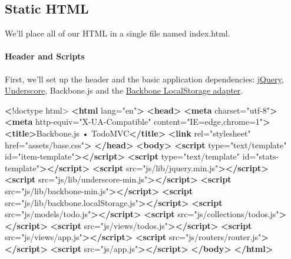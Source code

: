 \documentclass[9pt]{book}
\newenvironment{Shaded}{}{}
\newcommand{\KeywordTok}[1]{\textcolor[rgb]{0.00,0.44,0.13}{\textbf{{#1}}}}
\newcommand{\StringTok}[1]{\textcolor[rgb]{0.25,0.44,0.63}{{#1}}}
\newcommand{\OtherTok}[1]{\textcolor[rgb]{0.00,0.44,0.13}{{#1}}}
\newcommand{\ErrorTok}[1]{\textcolor[rgb]{1.00,0.00,0.00}{\textbf{{#1}}}}
\newcommand{\NormalTok}[1]{{#1}}
\begin{document}
\subsection{Static HTML}\label{static-html}

We'll place all of our HTML in a single file named index.html.

\paragraph{Header and Scripts}\label{header-and-scripts}

First, we'll set up the header and the basic application dependencies:
\href{http://jquery.com}{jQuery},
\href{http://underscorejs.org}{Underscore}, Backbone.js and the
\href{https://github.com/jeromegn/Backbone.localStorage}{Backbone
LocalStorage adapter}.

\begin{Shaded}
\begin{Highlighting}[]
\ErrorTok{<}\NormalTok{!doctype html>}
\KeywordTok{<html}\OtherTok{ lang=}\StringTok{"en"}\KeywordTok{>}
\KeywordTok{<head>}
  \KeywordTok{<meta}\OtherTok{ charset=}\StringTok{"utf-8"}\KeywordTok{>}
  \KeywordTok{<meta}\OtherTok{ http-equiv=}\StringTok{"X-UA-Compatible"}\OtherTok{ content=}\StringTok{"IE=edge,chrome=1"}\KeywordTok{>}
  \KeywordTok{<title>}\NormalTok{Backbone.js • TodoMVC}\KeywordTok{</title>}
  \KeywordTok{<link}\OtherTok{ rel=}\StringTok{"stylesheet"}\OtherTok{ href=}\StringTok{"assets/base.css"}\KeywordTok{>}
\KeywordTok{</head>}
\KeywordTok{<body>}
  \KeywordTok{<script}\OtherTok{ type=}\StringTok{"text/template"}\OtherTok{ id=}\StringTok{"item-template"}\KeywordTok{></script>}
  \KeywordTok{<script}\OtherTok{ type=}\StringTok{"text/template"}\OtherTok{ id=}\StringTok{"stats-template"}\KeywordTok{></script>}
  \KeywordTok{<script}\OtherTok{ src=}\StringTok{"js/lib/jquery.min.js"}\KeywordTok{></script>}
  \KeywordTok{<script}\OtherTok{ src=}\StringTok{"js/lib/underscore-min.js"}\KeywordTok{></script>}
  \KeywordTok{<script}\OtherTok{ src=}\StringTok{"js/lib/backbone-min.js"}\KeywordTok{></script>}
  \KeywordTok{<script}\OtherTok{ src=}\StringTok{"js/lib/backbone.localStorage.js"}\KeywordTok{></script>}
  \KeywordTok{<script}\OtherTok{ src=}\StringTok{"js/models/todo.js"}\KeywordTok{></script>}
  \KeywordTok{<script}\OtherTok{ src=}\StringTok{"js/collections/todos.js"}\KeywordTok{></script>}
  \KeywordTok{<script}\OtherTok{ src=}\StringTok{"js/views/todos.js"}\KeywordTok{></script>}
  \KeywordTok{<script}\OtherTok{ src=}\StringTok{"js/views/app.js"}\KeywordTok{></script>}
  \KeywordTok{<script}\OtherTok{ src=}\StringTok{"js/routers/router.js"}\KeywordTok{></script>}
  \KeywordTok{<script}\OtherTok{ src=}\StringTok{"js/app.js"}\KeywordTok{></script>}
\KeywordTok{</body>}
\KeywordTok{</html>}
\end{Highlighting}
\end{Shaded}
\end{document}
